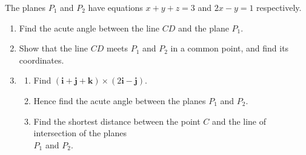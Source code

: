 \documentclass[leqno]{article}
\begin{document}
\begin{enumerate}[
  label=\textbf{\arabic*.},
  leftmargin=*,
  topsep=0pt,
  partopsep=0pt,
  parsep=0pt
]
The planes $P_1$ and $P_2$ have equations $x+y+z=3$ and $2x-y=1$ respectively. \\
\begin{enumerate}[label=\textbf{(\alph*)}]
  \item Find the acute angle between the line $CD$ and the plane $P_1$.  \\
  \item Show that the line $CD$ meets $P_1$ and $P_2$ in a common point, and find its coordinates.  \\
  \item
  \begin{enumerate}[label=(\roman*)]
    \item Find $(\mathbf{i}+\mathbf{j}+\mathbf{k})\times(2\mathbf{i}-\mathbf{j})$. 
    \item Hence find the acute angle between the planes $P_1$ and $P_2$. 
    \item Find the shortest distance between the point $C$ and the line of intersection of the planes\\ $P_1$ and $P_2$.  \\
  \end{enumerate}
\end{enumerate}

\newpage

\questionitem


\end{enumerate}
\end{document}
